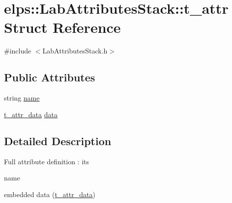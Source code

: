 \hypertarget{structelps_1_1_lab_attributes_stack_1_1t__attr}{\section{elps\+:\+:Lab\+Attributes\+Stack\+:\+:t\+\_\+attr Struct Reference}
\label{structelps_1_1_lab_attributes_stack_1_1t__attr}
}


{\ttfamily \#include $<$Lab\+Attributes\+Stack.\+h$>$}

\subsection*{Public Attributes}
\begin{DoxyCompactItemize}
\item 
string \hyperlink{structelps_1_1_lab_attributes_stack_1_1t__attr_a6081ff65525e6e2895c72903da219803}{name}
\item 
\hyperlink{structelps_1_1_lab_attributes_stack_1_1t__attr__data}{t\+\_\+attr\+\_\+data} \hyperlink{structelps_1_1_lab_attributes_stack_1_1t__attr_a40f2a6b918faf72d03a62ce77e3a017c}{data}
\end{DoxyCompactItemize}


\subsection{Detailed Description}
Full attribute definition \+: its
\begin{DoxyItemize}
\item name
\item embedded data (\hyperlink{structelps_1_1_lab_attributes_stack_1_1t__attr__data}{t\+\_\+attr\+\_\+data}) 
\end{DoxyItemize}

